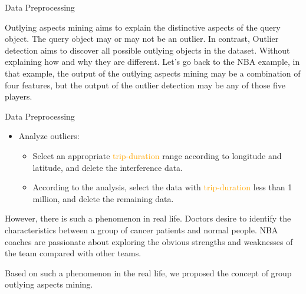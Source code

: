 \documentclass[
 size=14pt,
 paper=smartboard,  %
 mode=present, 		%
 display=slides, 	%
 style=tuliplab,  	%
 pauseslide,
 fleqn,leqno]{powerdot}
\begin{document}
\begin{slide}{Data Preprocessing}
\begin{note}
Outlying aspects mining aims to
explain the distinctive aspects of the query object.
The query object may or may not be an outlier.
In contrast,
Outlier detection aims to discover all possible
outlying objects in the dataset.
Without explaining how and why they are different.
Let's go back to the NBA example,
in that example,
the output of the outlying aspects mining may be
a combination of four features,
but the output of the outlier detection may be any of those five players.
\end{note}

\end{slide}

\begin{slide}[toc=,bm=]{Data Preprocessing}

\begin{itemize}
\item
Analyze outliers:
\begin{itemize}
\item
Select an appropriate \textcolor{orange}{trip-duration} range according to longitude and latitude, and delete the interference data.

\item
According to the analysis, select the data with \textcolor{orange}{trip-duration} less than 1 million, and delete the remaining data.
\end{itemize}
\end{itemize}



\begin{note}
However,
there is such a phenomenon in real life.
Doctors desire to identify the characteristics between
a group of cancer patients and normal people.
NBA coaches are passionate about exploring the obvious strengths and
weaknesses of the team compared with other teams.

Based on such a phenomenon in the real life,
we proposed the concept of group outlying aspects mining.
\end{note}

\end{slide}
\end{document}
